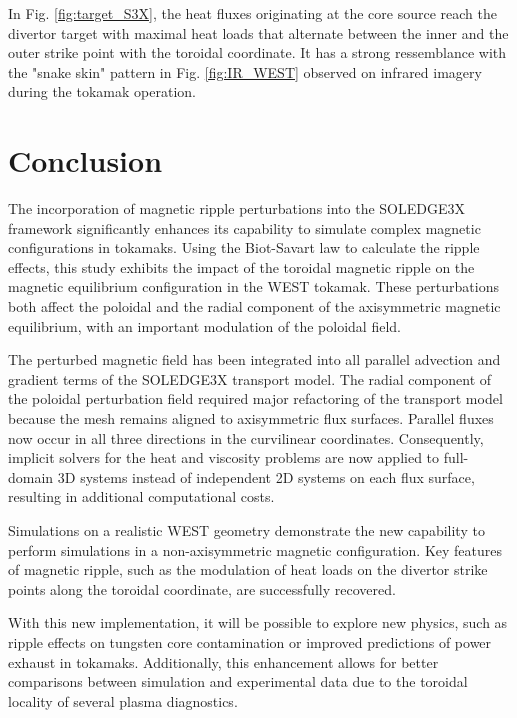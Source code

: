 In Fig. \ref{fig:target_S3X}, the heat fluxes originating at the core source reach the divertor target with maximal heat loads that alternate between the inner and the outer strike point with the toroidal coordinate. It has a strong ressemblance with the "snake skin" pattern in Fig. \ref{fig:IR_WEST} observed on infrared imagery during the tokamak operation. 


\section{Conclusion}
The incorporation of magnetic ripple perturbations into the SOLEDGE3X framework significantly enhances its capability to simulate complex magnetic configurations in tokamaks. Using the Biot-Savart law to calculate the ripple effects, this study exhibits the impact of the toroidal magnetic ripple on the magnetic equilibrium configuration in the WEST tokamak. These perturbations both affect the poloidal and the radial component of the axisymmetric magnetic equilibrium, with an important modulation of the poloidal field. \newline

The perturbed magnetic field has been integrated into all parallel advection and gradient terms of the SOLEDGE3X transport model. The radial component of the poloidal perturbation field required major refactoring of the transport model because the mesh remains aligned to axisymmetric flux surfaces. Parallel fluxes now occur in all three directions in the curvilinear coordinates. Consequently, implicit solvers for the heat and viscosity problems are now applied to full-domain 3D systems instead of independent 2D systems on each flux surface, resulting in additional computational costs. \newline

Simulations on a realistic WEST geometry demonstrate the new capability to perform simulations in a non-axisymmetric magnetic configuration. Key features of magnetic ripple, such as the modulation of heat loads on the divertor strike points along the toroidal coordinate, are successfully recovered. \newline

With this new implementation, it will be possible to explore new physics, such as ripple effects on tungsten core contamination or improved predictions of power exhaust in tokamaks. Additionally, this enhancement allows for better comparisons between simulation and experimental data due to the toroidal locality of several plasma diagnostics.
